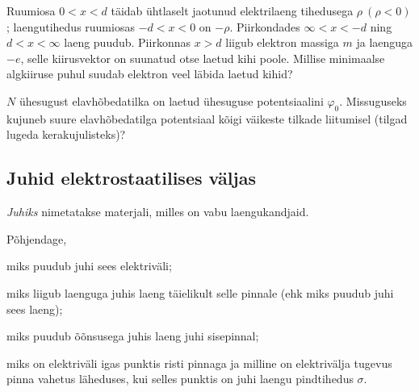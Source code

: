 \documentclass[a4paper,11pt,twocolumn]{article}
\begin{document}
\begin{question}
    Ruumiosa \( 0 < x < d \) täidab ühtlaselt jaotunud elektrilaeng tihedusega \( \rho \ (\rho<0)\); laengutihedus ruumiosas \( −d < x < 0 \) on \( -\rho \). Piirkondades \( \infty < x < −d \) ning \( d < x < \infty \) laeng puudub. Piirkonnas \( x > d \) liigub elektron massiga \( m \) ja laenguga \( −e \), selle kiirusvektor on suunatud otse laetud kihi poole. Millise minimaalse algkiiruse puhul suudab elektron veel läbida laetud kihid?
\end{question}

\begin{question}
    \( N \) ühesugust elavhõbedatilka on laetud ühesuguse potentsiaalini \( \varphi_0 \). Missuguseks kujuneb suure elavhõbedatilga potentsiaal kõigi väikeste tilkade liitumisel (tilgad lugeda kerakujulisteks)?
\end{question}

\subsection{Juhid elektrostaatilises väljas}
\textit{Juhiks} nimetatakse materjali, milles on vabu laengukandjaid.
\begin{question}
    Põhjendage,
    \begin{subquestion}
    \item miks puudub juhi sees elektriväli;
    \item miks liigub laenguga juhis laeng täielikult selle pinnale (ehk miks puudub juhi sees laeng);
    \item miks puudub õõnsusega juhis laeng juhi sisepinnal;
    \item miks on elektriväli igas punktis risti pinnaga ja milline on elektrivälja tugevus pinna vahetus läheduses, kui selles punktis on juhi laengu pindtihedus $\sigma$.
    \end{subquestion}
\end{question}

\end{document}
